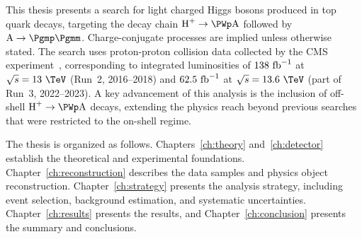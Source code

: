 This thesis presents a search for light charged Higgs bosons produced in top quark decays, targeting the decay chain $\PHp \to \PWp\PA$ followed by $\PA \to \Pgmp\Pgmm$. Charge-conjugate processes are implied unless otherwise stated. The search uses proton-proton collision data collected by the CMS experiment~\cite{CMS:2008xjf}, corresponding to integrated luminosities of $138~\text{fb}^{-1}$ at $\sqrt{s} = 13~\TeV$ (Run~2, 2016--2018) and $62.5~\text{fb}^{-1}$ at $\sqrt{s} = 13.6~\TeV$ (part of Run~3, 2022--2023). A key advancement of this analysis is the inclusion of off-shell $\PHp \to \PWp\PA$ decays, extending the physics reach beyond previous searches that were restricted to the on-shell regime.

The thesis is organized as follows. Chapters~\ref{ch:theory} and~\ref{ch:detector} establish the theoretical and experimental foundations. Chapter~\ref{ch:reconstruction} describes the data samples and physics object reconstruction. Chapter~\ref{ch:strategy} presents the analysis strategy, including event selection, background estimation, and systematic uncertainties. Chapter~\ref{ch:results} presents the results, and Chapter~\ref{ch:conclusion} presents the summary and conclusions.
